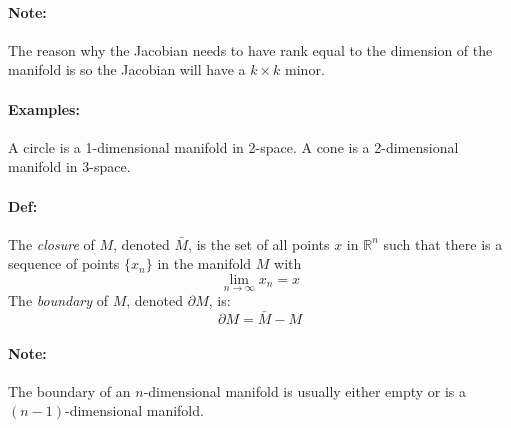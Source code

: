 \documentclass[10pt,a4paper]{article}
\begin{document}
\paragraph{Note:} The reason why the Jacobian needs to have rank equal to the dimension of the manifold is so the Jacobian will have a $k\times k $ minor.

\paragraph{Examples:} A circle is a 1-dimensional manifold in 2-space. A cone is a 2-dimensional manifold in 3-space.

\paragraph{Def:} The \textit{closure} of $M$, denoted $\bar{M}$, is the set of all points $x$ in $\mathbb{R}^n$ such that there is a sequence of points $\{x_n\}$ in the manifold $M$ with
$$\lim_{n \to \infty} x_n = x$$
The \textit{boundary} of $M$, denoted $\partial M$, is:
$$ \partial M = \bar{M} - M$$

\paragraph{Note:} The boundary of an $n$-dimensional manifold is usually either empty or is a $(n-1)$-dimensional manifold.
\end{document}
